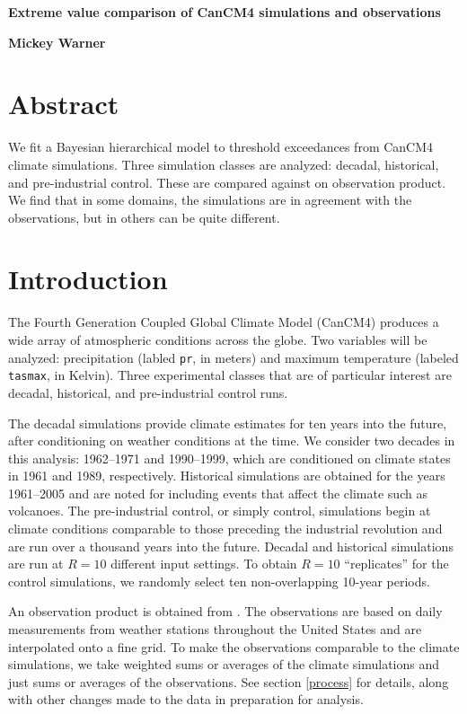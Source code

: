 \documentclass[12pt]{article}
\begin{document}
\begin{Large}
\noindent \textbf{Extreme value comparison of CanCM4 simulations and observations}
\end{Large}
\bigskip

\noindent \textbf{Mickey Warner}


\section{Abstract}
\label{abstract}
We fit a Bayesian hierarchical model to threshold exceedances from CanCM4 climate simulations. Three simulation classes are analyzed: decadal, historical, and pre-industrial control. These are compared against on observation product. We find that in some domains, the simulations are in agreement with the observations, but in others can be quite different.

\section{Introduction}
\label{intro}

The Fourth Generation Coupled Global Climate Model (CanCM4) produces a wide array of atmospheric conditions across the globe. Two variables will be analyzed: precipitation (labled \texttt{pr}, in meters) and maximum temperature (labeled \texttt{tasmax}, in Kelvin). Three experimental classes that are of particular interest are decadal, historical, and pre-industrial control runs.

The decadal simulations provide climate estimates for ten years into the future, after conditioning on weather conditions at the time. We consider two decades in this analysis: 1962--1971 and 1990--1999, which are conditioned on climate states in 1961 and 1989, respectively. Historical simulations are obtained for the years 1961--2005 and are noted for including events that affect the climate such as volcanoes. The pre-industrial control, or simply control, simulations begin at climate conditions comparable to those preceding the industrial revolution and are run over a thousand years into the future. Decadal and historical simulations are run at $R=10$ different input settings. To obtain $R=10$ ``replicates'' for the control simulations, we randomly select ten non-overlapping 10-year periods.

An observation product is obtained from \cite{maurer2002long}. The observations are based on daily measurements from weather stations throughout the United States and are interpolated onto a fine grid. To make the observations comparable to the climate simulations, we take weighted sums or averages of the climate simulations and just sums or averages of the observations. See section \ref{process} for details, along with other changes made to the data in preparation for analysis.
\end{document}
